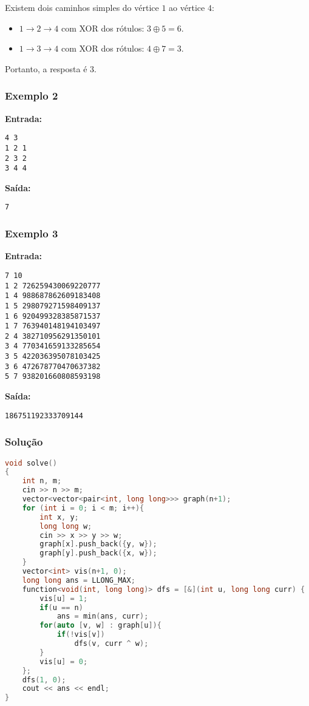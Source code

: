 Existem dois caminhos simples do vértice \(1\) ao vértice \(4\):
\begin{itemize}
    \item \(1 \to 2 \to 4\) com XOR dos rótulos: \(3 \oplus 5 = 6\).
    \item \(1 \to 3 \to 4\) com XOR dos rótulos: \(4 \oplus 7 = 3\).
\end{itemize}
Portanto, a resposta é \(3\).

\subsubsection*{Exemplo 2}
\textbf{Entrada:}
\begin{verbatim}
4 3
1 2 1
2 3 2
3 4 4
\end{verbatim}
\textbf{Saída:}
\begin{verbatim}
7
\end{verbatim}

\subsubsection*{Exemplo 3}
\textbf{Entrada:}
\begin{verbatim}
7 10
1 2 726259430069220777
1 4 988687862609183408
1 5 298079271598409137
1 6 920499328385871537
1 7 763940148194103497
2 4 382710956291350101
3 4 770341659133285654
3 5 422036395078103425
3 6 472678770470637382
5 7 938201660808593198
\end{verbatim}
\textbf{Saída:}
\begin{verbatim}
186751192333709144
\end{verbatim}

\subsubsection*{Solução}
\begin{lstlisting}[language=C++]
void solve()
{
    int n, m; 
    cin >> n >> m;
    vector<vector<pair<int, long long>>> graph(n+1);
    for (int i = 0; i < m; i++){
        int x, y; 
        long long w; 
        cin >> x >> y >> w;
        graph[x].push_back({y, w});
        graph[y].push_back({x, w});
    }
    vector<int> vis(n+1, 0);
    long long ans = LLONG_MAX;
    function<void(int, long long)> dfs = [&](int u, long long curr) {
        vis[u] = 1;
        if(u == n)
            ans = min(ans, curr);
        for(auto [v, w] : graph[u]){
            if(!vis[v])
                dfs(v, curr ^ w);
        }
        vis[u] = 0;
    };
    dfs(1, 0);
    cout << ans << endl;
}
\end{lstlisting}

